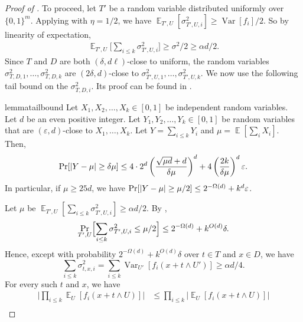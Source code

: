 \documentclass{toc}
\newcommand{\zo}{\{0,1\}}
\def\eps{\varepsilon}
\def\Blocklength{\ell}
\DeclarePairedDelimiter{\abs}{\lvert}{\rvert}
\DeclareMathOperator*{\E}{\mathbb{E}}                 %
\DeclareMathOperator*{\Var}{Var}                 %
\begin{document}
\begin{proof}[Proof of {}]
    To proceed, let $T'$ be a random variable distributed uniformly over $\zo^m$.
    Applying  with $\eta = 1/2$, we have $\E_{T',U}[ \sigma_{T',U,i}^2 ] \ge \Var[f_i] / 2$.
    So by linearity of expectation,
    \begin{align*}
      \E_{T',U} \Big[\sum_{i \le k} \sigma_{T',U,i}^2 \Big]
      \ge \sigma^2 / 2
      \ge \alpha d / 2 .
    \end{align*}
    Since $T$ and $D$ are both $(\delta, d\Blocklength)$-close to uniform, the random variables
    $\sigma_{T,D,1}^2, \ldots, \sigma_{T,D,k}^2$ are $(2 \delta, d)$-close to $\sigma_{T',U,1}^2, \ldots, \sigma_{T',U,k}^2$.
    We now use the following tail bound on the $\sigma_{T,D,i}^2$. 
    Its proof can be found in .
    \begin{restatable}{lemma}{tailbound} \label{lemma-tail-bound-almost-independent-real}
      Let $X_1, X_2, \ldots, X_k \in [0,1]$ be independent random variables.
      Let $d$ be an even positive integer.
      Let $Y_1, Y_2, \ldots, Y_k \in [0,1]$ be random variables that are $(\eps, d)$-close to $X_1, \ldots, X_k$.
      Let $Y = \sum_{i \le k} Y_i$ and $\mu = \E[\sum_i X_i]$.
      Then,
      \[
        \Pr[ \abs{Y - \mu} \ge \delta \mu ]
        \le 4 \cdot 2^d \left( \frac{\sqrt{\mu d} + d}{ \delta \mu} \right)^d + 4 \left( \frac{2k}{\delta \mu} \right)^d \eps.
      \]
      In particular, if $\mu \ge 25 d$, we have $\Pr[\abs{Y - \mu} \ge \mu/2] \le 2^{-\Omega(d)} + k^d \eps$.
    \end{restatable}
    Let $\mu$ be $\E_{T',U} [ \sum_{i \le k} \sigma_{T',U,i}^2 ] \ge \alpha d / 2$.
    By ,
    \begin{align}
      \Pr_{T',U} \Bigl[ \sum_{i \le k} \sigma_{T',U,i}^2 \le \mu / 2 \Bigr]
      \le 2^{-\Omega(d)} + k^{O(d)} \delta .\label{eqn:tail-bound-for-high-Tvar}
    \end{align}
    Hence, except with probability $2^{-\Omega(d)} + k^{O(d)} \delta$ over $t \in T$ and $x \in D$, we have
    \[
      \sum_{i \le k} \sigma_{t,x,i}^2
      = \sum_{i \le k} \Var_{U'}[f_i(x + t \wedge U')]
      \ge \alpha d / 4 .
    \]
    For every such $t$ and $x$, we have
    \begin{align} \label{eqn:small-mean-under-D-and-T}
      \Big| \prod_{i \le k} \E_{U}[f_i(x + t \wedge U)] \Big|
      &\le \prod_{i \le k} \Big| \E_{U}[f_i(x + t \wedge U)] \Big| \nonumber \\

\end{align}
\end{proof}
\end{document}
